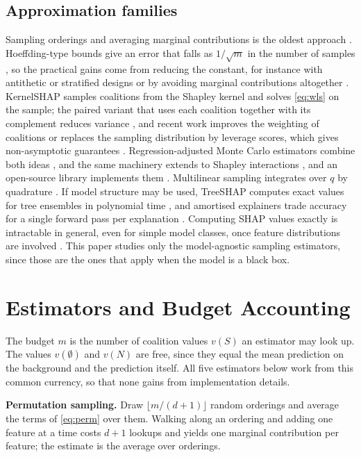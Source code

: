 \documentclass[conference]{IEEEtran}
\begin{document}
\subsection{Approximation families}
Sampling orderings and averaging marginal contributions is the oldest approach \cite{strumbelj2014}. Hoeffding-type bounds give an error that falls as $1/\sqrt{m}$ in the number of samples \cite{maleki2013}, so the practical gains come from reducing the constant, for instance with antithetic or stratified designs \cite{mitchell2022} or by avoiding marginal contributions altogether \cite{kolpaczki2024,fumagalli2023}. KernelSHAP samples coalitions from the Shapley kernel and solves \eqref{eq:wls} on the sample; the paired variant that uses each coalition together with its complement reduces variance \cite{covert2021kernel}, and recent work improves the weighting of coalitions \cite{olsen2024} or replaces the sampling distribution by leverage scores, which gives non-asymptotic guarantees \cite{musco2025}. Regression-adjusted Monte Carlo estimators combine both ideas \cite{witter2025}, and the same machinery extends to Shapley interactions \cite{fumagalli2023,fumagalli2024}, and an open-source library implements them \cite{muschalik2024}. Multilinear sampling integrates over $q$ by quadrature \cite{okhrati2021}. If model structure may be used, TreeSHAP computes exact values for tree ensembles in polynomial time \cite{lundberg2020trees}, and amortised explainers trade accuracy for a single forward pass per explanation \cite{jethani2022}. Computing SHAP values exactly is intractable in general, even for simple model classes, once feature distributions are involved \cite{vandenbroeck2021}. This paper studies only the model-agnostic sampling estimators, since those are the ones that apply when the model is a black box.

\section{Estimators and Budget Accounting}
\label{sec:estimators}
The budget $m$ is the number of coalition values $v(S)$ an estimator may look up. The values $v(\emptyset)$ and $v(N)$ are free, since they equal the mean prediction on the background and the prediction itself. All five estimators below work from this common currency, so that none gains from implementation details.

\textbf{Permutation sampling.} Draw $\lfloor m/(d+1)\rfloor$ random orderings and average the terms of \eqref{eq:perm} over them. Walking along an ordering and adding one feature at a time costs $d+1$ lookups and yields one marginal contribution per feature; the estimate is the average over orderings.
\end{document}
